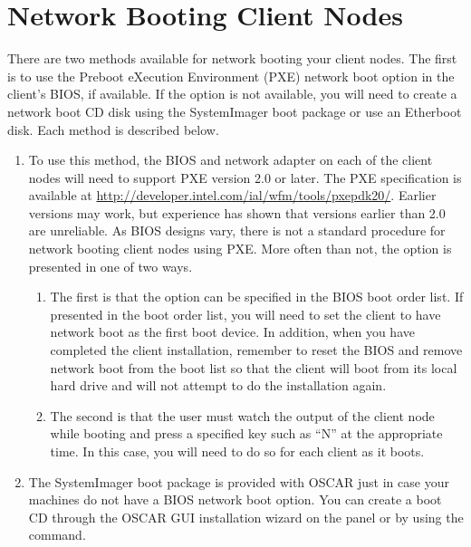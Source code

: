 %
%
%

\section{Network Booting Client Nodes}
\label{app:net-boot-client-nodes}

There are two methods available for network booting your client nodes.
The first is to use the Preboot eXecution Environment (PXE) network
boot option in the client's BIOS, if available. If the option is not
available, you will need to create a network boot CD disk using
the SystemImager boot package or use an Etherboot disk. Each method 
is described below.

\begin{enumerate}
\item {} To use this method, the BIOS
  and network adapter on each of the client nodes will need to support
  PXE version 2.0 or later. The PXE specification is available at
  \url{http://developer.intel.com/ial/wfm/tools/pxepdk20/}.  Earlier
  versions may work, but experience has shown that versions earlier
  than 2.0 are unreliable. As BIOS designs vary, there is not a
  standard procedure for network booting client nodes using PXE.  More
  often than not, the option is presented in one of two ways.

  \begin{enumerate}
  \item The first is that the option can be specified in the BIOS boot
    order list. If presented in the boot order list, you will need to
    set the client to have network boot as the first boot device. In
    addition, when you have completed the client installation,
    remember to reset the BIOS and remove network boot from the boot
    list so that the client will boot from its local hard drive and
    will not attempt to do the installation again.
    
  \item The second is that the user must watch the output of the
    client node while booting and press a specified key such as ``N''
    at the appropriate time. In this case, you will need to do so for
    each client as it boots.
  \end{enumerate}
  
\item {} The
  SystemImager boot package is provided with OSCAR just in case your
  machines do not have a BIOS network boot option.  You can create a
  boot CD through the OSCAR GUI installation wizard on the
   panel or by using the
   command.
  

\end{enumerate}
